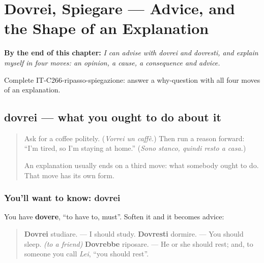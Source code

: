 
\chapter{Dovrei, Spiegare --- Advice, and the Shape of an Explanation}
\label{ch:it-advice-and-explanation}

\begin{chapteropening}
\textbf{By the end of this chapter:} \emph{I can advise with dovrei and dovresti, and explain myself in four moves: an opinion, a cause, a consequence and advice.}

Complete IT-C266-ripasso-spiegazione: answer a why-question with all four moves of an explanation.
\end{chapteropening}

\section[dovrei]{dovrei — what you ought to do about it}

\label{lesson:IT-C266-dovrei}



\begin{quote}
Ask for a coffee politely. (\emph{Vorrei un caffè.}) Then run a reason forward: \textquotedblleft{}I'm tired, so I'm staying at home.\textquotedblright{} (\emph{Sono stanco, quindi resto a casa.})

An explanation usually ends on a third move: what somebody ought to do. That move has its own form.
\end{quote}

\subsection*{You'll want to know: dovrei}
You have \textbf{dovere}, \textquotedblleft{}to have to, must\textquotedblright{}. Soften it and it becomes advice:

\begin{quote}
\textbf{Dovrei} studiare. — I should study. \textbf{Dovresti} dormire. — You should sleep. \emph{(to a friend)} \textbf{Dovrebbe} riposare. — He or she should rest; and, to someone you call \emph{Lei}, \textquotedblleft{}you should rest\textquotedblright{}.
\end{quote}

